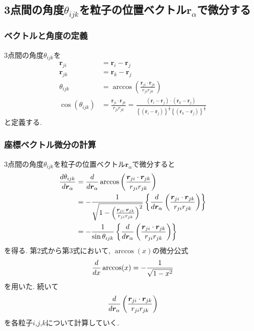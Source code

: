 \subsection{3点間の角度$\theta_{ijk}$を粒子の位置ベクトル$\bm{r}_{\alpha}$で微分する}
\subsubsection{ベクトルと角度の定義}
3点間の角度$\theta_{ijk}$を
\begin{align}
   \bm{r}_{ji}
&= \bm{r}_{i} - \bm{r}_{j}
\\
   \bm{r}_{jk}
&= \bm{r}_{k} - \bm{r}_{j}
\\
   \theta_{ijk}
&= \arccos \left( \frac{\bm{r}_{ji} \cdot \bm{r}_{jk}}{r_{ji} r_{jk}} \right)
\\
   \cos(\theta_{ijk})
&= \frac{\bm{r}_{ji} \cdot \bm{r}_{jk}}{r_{ji} r_{jk}}
 = \frac{(\bm{r}_{i} - \bm{r}_{j}) \cdot (\bm{r}_{k} - \bm{r}_{j})}
        {\left\{(\bm{r}_{i} - \bm{r}_{j})\right\}^{\frac{1}{2}}
         \left\{(\bm{r}_{k} - \bm{r}_{j})\right\}^{\frac{1}{2}}}
\end{align}
と定義する.

\subsubsection{座標ベクトル微分の計算}
3点間の角度$\theta_{ijk}$を粒子の位置ベクトル$\bm{r}_{\alpha}$で微分すると
\begin{align}
    \frac{d \theta_{ijk}}{d \bm{r}_{\alpha}}
 &=
    \frac{d}{d \bm{r}_{\alpha}}
    \arccos \left( \frac{\bm{r}_{ji} \cdot \bm{r}_{jk}}{r_{ji} r_{jk}} \right)
 \notag \\
 &=
   -\frac{1}
         {\sqrt{1- \left(\frac{\bm{r}_{ji} \cdot \bm{r}_{jk}}{r_{ji} r_{jk}}\right)^{2}}}
    \left\{
            \frac{d}{d \bm{r}_{\alpha}}
            \left(\frac{\bm{r}_{ji} \cdot \bm{r}_{jk}}{r_{ji} r_{jk}}\right)
    \right\}
 \notag \\
 &=
   -\frac{1}{\sin\theta_{ijk}}
    \left\{
            \frac{d}{d \bm{r}_{\alpha}}
            \left(\frac{\bm{r}_{ji} \cdot \bm{r}_{jk}}{r_{ji} r_{jk}}\right)
    \right\}
  \notag
\end{align}
を得る. 第2式から第3式において, $\arccos(x)$の微分公式
\begin{equation}
\frac{d}{dx}\arccos(x) = - \frac{1}{\sqrt{1-x^2}}
\notag
\end{equation}
を用いた. 続いて
\begin{equation}
 \frac{d}{d \bm{r}_{\alpha}}
 \left(\frac{\bm{r}_{ji} \cdot \bm{r}_{jk}}{r_{ji} r_{jk}}\right)
 \notag
\end{equation}
を各粒子$i$,$j$,$k$について計算していく.

